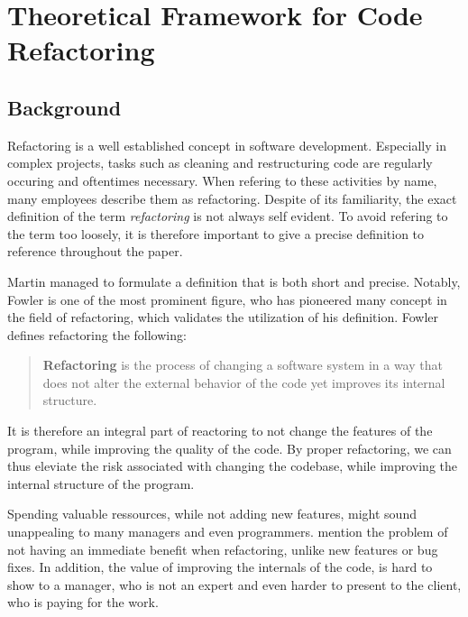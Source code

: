 \chapter{Theoretical Framework for Code Refactoring}

\section{Background}



Refactoring is a well established concept in software development. 
Especially in complex projects, 
	tasks such as cleaning and restructuring code are regularly occuring and oftentimes necessary. 
When refering to these activities by name, many employees describe them as refactoring. 
Despite of its familiarity, 
	the exact definition of the term \emph{refactoring} is not always self evident.
To avoid refering to the term too loosely, 
	it is therefore important to give a precise definition to reference throughout the paper. 

Martin \textcite[p. ~xiv]{fowler2018} managed to formulate a definition that is both short and precise. 
Notably, Fowler is one of the most prominent figure, 
	who has pioneered many concept in the field of refactoring,
	which validates the utilization of his definition.
Fowler defines refactoring the following:
\begin{quote}
\textbf{Refactoring} is the process of changing a software system in a way 
	that does not alter the external behavior of the code yet improves its internal structure.
\end{quote}

It is therefore an integral part of reactoring to not change the features of the program, 
	while improving the quality of the code.
By proper refactoring, we can thus eleviate the risk associated with changing the codebase,
	while improving the internal structure of the program.


Spending valuable ressources, while not adding new features, 
	might sound unappealing to many managers and even programmers.
\textcite[p.~1]{kim2012} mention the problem of not having an immediate benefit when refactoring, 
	unlike new features or bug fixes.
In addition, the value of improving the internals of the code, is hard to show to a manager, 
	who is not an expert and even harder to present to the client, who is paying for the work.

